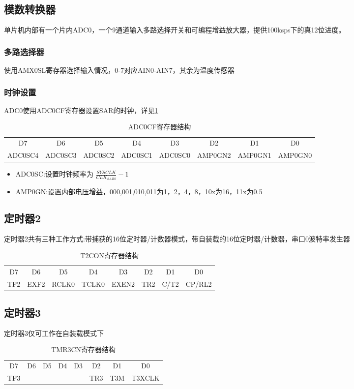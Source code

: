 \begin{CJK}
\subsection{模数转换器}
单片机内部有一个片内ADC0，一个9通道输入多路选择开关和可编程增益放大器，提供100ksps下的真12位进度。
\subsubsection{多路选择器}
使用AMX0SL寄存器选择输入情况，0-7对应AIN0-AIN7，其余为温度传感器
\subsubsection{时钟设置}
ADC0使用ADC0CF寄存器设置SAR的时钟，详见\ref{table_ADC0CF}
\begin{table}[!htbp]
  \caption{ADC0CF寄存器结构}
  \label{table_ADC0CF}
  \begin{tabular}{|c|c|c|c|c|c|c|c|}
    \hline
    D7&D6&D5&D4&D3&D2&D1&D0\\
    ADC0SC4&ADC0SC3&ADC0SC2&ADC0SC1&ADC0SC0&AMP0GN2&AMP0GN1&AMP0GN0\\
    \hline
  \end{tabular}
\end{table}
\begin{itemize}
  \item ADC0SC:设置时钟频率为 $\frac{SYSCLK}{CLK_{SAR0}}-1$
  \item AMP0GN:设置内部电压增益，000,001,010,011为1，2，4，8，10x为16，11x为0.5
\end{itemize}
\subsection{定时器2}
定时器2共有三种工作方式:带捕获的16位定时器/计数器模式，带自装载的16位定时器/计数器，串口0波特率发生器
\begin{table}[!htbp]
  \centering
  \caption{T2CON寄存器结构}
  \begin{tabular}{|c|c|c|c|c|c|c|c|}
    \hline
    D7&D6&D5&D4&D3&D2&D1&D0\\
    TF2&EXF2&RCLK0&TCLK0&EXEN2&TR2&C/T2&CP/RL2\\
    \hline
  \end{tabular}

\end{table}

\subsection{定时器3}
定时器3仅可工作在自装载模式下
\begin{table}[!htbp]
  \centering
  \caption{TMR3CN寄存器结构}
  \begin{tabular}{|c|c|c|c|c|c|c|c|}
    \hline
    D7&D6&D5&D4&D3&D2&D1&D0\\
    TF3&&&&&TR3&T3M&T3XCLK\\
    \hline
  \end{tabular}


\end{table}
\end{CJK}
